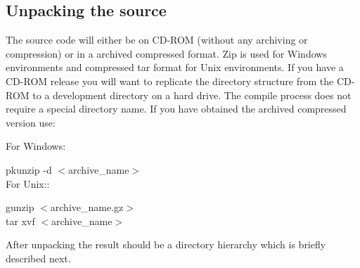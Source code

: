 \documentclass[10pt]{article}
\begin{document}
\subsection*{Unpacking the source}

The source code will either be on CD-ROM (without any archiving or
compression) or in a archived compressed format. Zip is used for
Windows environments and compressed tar format for Unix environments.
If you have a CD-ROM release you will want to replicate the directory
structure from the CD-ROM to a development directory on a hard drive.
The compile process does not require a special directory name.  If you
have obtained the archived compressed version use:

 For Windows:

 pkunzip -d $<$archive\_name$>$\\

 For Unix:: 

 gunzip $<$archive\_name.gz$>$\\ 
 tar xvf $<$archive\_name$>$ 
 
 After unpacking the result should be a directory hierarchy which is
 briefly described next.
\end{document}
